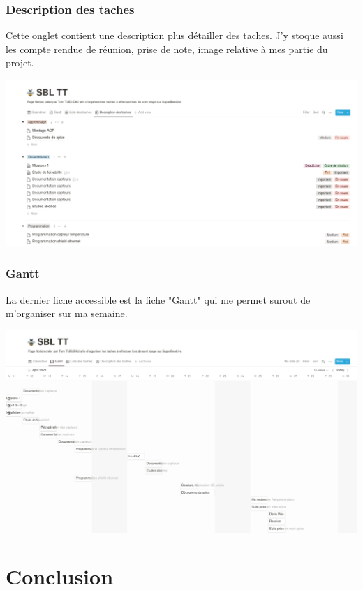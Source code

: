 \documentclass[11pt,french,a4paper]{article}
\begin{document}
\subsubsection{Description des taches}
Cette onglet contient une description plus détailler des taches. J'y stoque aussi les compte rendue de réunion, prise de note, image relative à mes partie du projet.
\begin{center}	
\includegraphics[scale=0.35]{../img/notiondescriptiondestaches.png}
\label{Description des taches}
\end{center}

\subsubsection{Gantt}
La dernier fiche accessible est la fiche "Gantt" qui me permet surout de m'organiser sur ma semaine. 
\begin{center}	
\includegraphics[scale=0.35]{../img/notiongantt.png}
\label{Gantt}
\end{center}
\newpage 
\section{Conclusion}
\end{document}

